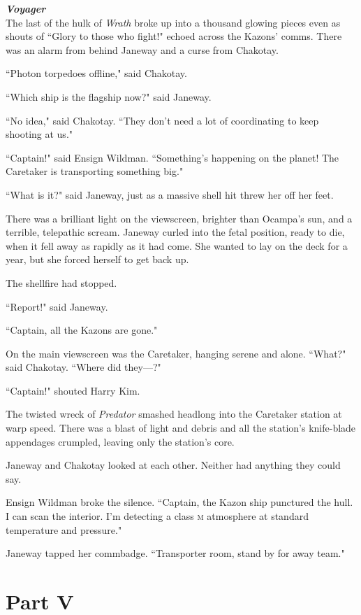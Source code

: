 \documentclass[twoside,letterpaper,12pt]{memoir}
\begin{document}
\noindent\textit{\textbf{Voyager}}\\

The last of the hulk of \textit{Wrath} broke up into a thousand glowing pieces even as shouts of ``Glory to those who fight!" echoed across the Kazons' comms. There was an alarm from behind Janeway and a curse from Chakotay. 

``Photon torpedoes offline," said Chakotay. 

``Which ship is the flagship now?" said Janeway. 

``No idea," said Chakotay. ``They don't need a lot of coordinating to keep shooting at us." 

``Captain!" said Ensign Wildman. ``Something's happening on the planet! The Caretaker is transporting something big." 

``What is it?" said Janeway, just as a massive shell hit threw her off her feet. 

There was a brilliant light on the viewscreen, brighter than Ocampa's sun, and a terrible, telepathic scream. Janeway curled into the fetal position, ready to die, when it fell away as rapidly as it had come. She wanted to lay on the deck for a year, but she forced herself to get back up. 

The shellfire had stopped. 

``Report!" said Janeway. 

``Captain, all the Kazons are gone." 

On the main viewscreen was the Caretaker, hanging serene and alone. ``What?" said Chakotay. ``Where did they---?" 

``Captain!" shouted Harry Kim. 

The twisted wreck of \textit{Predator} smashed headlong into the Caretaker station at warp speed. There was a blast of light and debris and all the station's knife-blade appendages crumpled, leaving only the station's core. 

Janeway and Chakotay looked at each other. Neither had anything they could say. 

Ensign Wildman broke the silence. ``Captain, the Kazon ship punctured the hull. I can scan the interior. I'm detecting a class \textsc{m} atmosphere at standard temperature and pressure." 

Janeway tapped her commbadge. ``Transporter room, stand by for away team."

\chapter*{Part V} 
\end{document}
